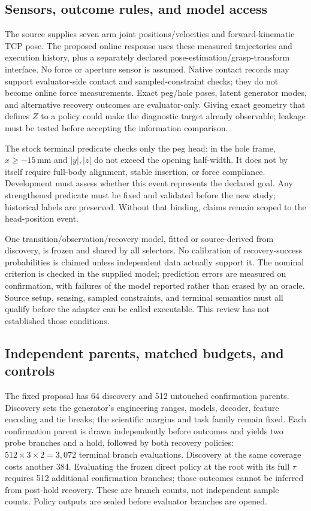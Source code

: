 \documentclass[conference]{IEEEtran}
\begin{document}
\subsection{Sensors, outcome rules, and model access}
The source supplies seven arm joint positions/velocities and forward-kinematic TCP pose. The proposed online response uses these measured trajectories and execution history, plus a separately declared pose-estimation/grasp-transform interface. No force or aperture sensor is assumed. Native contact records may support evaluator-side contact and sampled-constraint checks; they do not become online force measurements. Exact peg/hole poses, latent generator modes, and alternative recovery outcomes are evaluator-only. Giving exact geometry that defines $Z$ to a policy could make the diagnostic target already observable; leakage must be tested before accepting the information comparison.

The stock terminal predicate checks only the peg head: in the hole frame, $x\ge-15$\,mm and $|y|,|z|$ do not exceed the opening half-width. It does not by itself require full-body alignment, stable insertion, or force compliance. Development must assess whether this event represents the declared goal. Any strengthened predicate must be fixed and validated before the new study; historical labels are preserved. Without that binding, claims remain scoped to the head-position event.

One transition/observation/recovery model, fitted or source-derived from discovery, is frozen and shared by all selectors. No calibration of recovery-success probabilities is claimed unless independent data actually support it. The nominal criterion is checked in the supplied model; prediction errors are measured on confirmation, with failures of the model reported rather than erased by an oracle. Source setup, sensing, sampled constraints, and terminal semantics must all qualify before the adapter can be called executable. This review has not established those conditions.

\subsection{Independent parents, matched budgets, and controls}
The fixed proposal has 64 discovery and 512 untouched confirmation parents. Discovery sets the generator's engineering ranges, models, decoder, feature encoding and tie breaks; the scientific margins and task family remain fixed. Each confirmation parent is drawn independently before outcomes and yields two probe branches and a hold, followed by both recovery policies: $512\times3\times2=3{,}072$ terminal branch evaluations. Discovery at the same coverage costs another 384. Evaluating the frozen direct policy at the root with its full $\tau$ requires 512 additional confirmation branches; those outcomes cannot be inferred from post-hold recovery. These are branch counts, not independent sample counts. Policy outputs are sealed before evaluator branches are opened.
\end{document}
